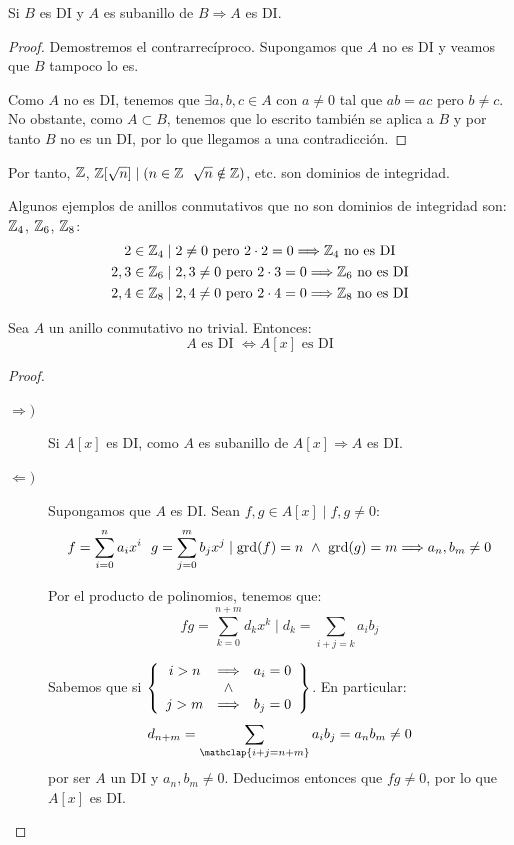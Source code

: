 \begin{lema}
    \label{lema:SubanilloDIEntoncesDI}
    Si $B$ es DI y $A$ es subanillo de $B \Longrightarrow A$ es DI.
\end{lema}
\begin{proof}
    Demostremos el contrarrecíproco. Supongamos que $A$ no es DI y veamos que $B$ tampoco lo es. 
    
    Como $A$ no es DI, tenemos que $\exists a,b,c \in A$ con $a \neq 0$ tal que $ab=ac $ pero $b \neq c$.
    No obstante, como $A\subset B$, tenemos que lo escrito también se aplica a $B$ y por tanto $B$ no es un DI, por lo que llegamos a una contradicción.
\end{proof}
Por tanto, $\mathbb Z$, $\mathbb Z[\sqrt{n}] \mid (n \in \mathbb Z~~\sqrt{n} \notin \mathbb Z)$, etc. son dominios de integridad.

\begin{ejemplo}
    Algunos ejemplos de anillos conmutativos que no son dominios de integridad son: $\mathbb Z_4$, $\mathbb Z_6$, $\mathbb Z_8$:
    \begin{gather*}
        2 \in \mathbb Z_4 \mid 2 \neq 0 \text{ pero } 2\cdot 2 = 0 \Longrightarrow \mathbb Z_4 \text{ no es DI}\\
        2,3 \in \mathbb Z_6 \mid 2,3 \neq 0 \text{ pero } 2 \cdot 3 = 0 \Longrightarrow \mathbb Z_6 \text{ no es DI}\\
        2,4 \in \mathbb Z_8 \mid 2,4 \neq 0 \text{ pero } 2 \cdot 4 = 0 \Longrightarrow \mathbb Z_8 \text{ no es DI}
    \end{gather*}
\end{ejemplo}

\begin{teo}
    Sea $A$ un anillo conmutativo no trivial. Entonces:
    $$A \text{ es DI } \Longleftrightarrow A[x] \text{ es DI}$$
\end{teo}
\begin{proof}\
\begin{description}
    \item[$\Longrightarrow)$] Si $A[x]$ es DI, como $A$ es subanillo de $A[x] \Longrightarrow A$ es DI.
    \item[$\Longleftarrow)$]
    Supongamos que $A$ es DI. Sean $f,g \in A[x] \mid f,g \neq 0$:
    $$f= \sum_{i=0}^n a_i x^i~~g = \sum_{j=0}^m b_j x^j \mid \operatorname{grd}(f) = n \ \land \  \operatorname{grd}(g) = m \Longrightarrow a_n, b_m \neq 0$$

    Por el producto de polinomios, tenemos que:
    $$fg = \sum_{k=0}^{n+m} d_k x^k \mid d_k = \sum_{i+j=k}a_i b_j$$

    Sabemos que si $\left\{\begin{array}{ccc}
            i>n & \Longrightarrow & a_i=0\\
             & \ \land \  & \\
            j>m & \Longrightarrow & b_j=0
        \end{array}\right\}$.
    En particular:
    $$d_{n+m} = \sum\limits_{\mathclap{i+j=n+m}}a_ib_j = a_n b_m \neq 0$$ por ser $A$ un DI y  $a_n, b_m \neq 0$. Deducimos entonces que $fg \neq 0$, por lo que $A[x]$ es DI.
\end{description}
\end{proof}

